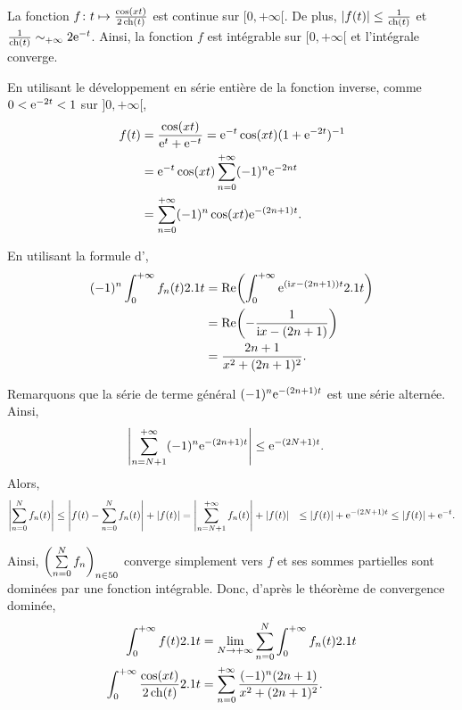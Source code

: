 \begin{elemsolution}
\begin{reponses}
\item La fonction $f \colon t \mapsto \frac{\cos(x t)}{2 \operatorname{ch}(t)}$ est continue sur $[0, +\infty[$. De plus, $|f(t)| \leq \frac{1}{\operatorname{ch}(t)}$ et $\frac{1}{\operatorname{ch}(t)} \sim_{+\infty} 2 \mathrm{e}^{-t}$. Ainsi, la fonction $f$ est intégrable sur $[0, +\infty[$ et l'intégrale converge.

\item En utilisant le développement en série entière de la fonction inverse, comme $0 < \mathrm{e}^{-2t} < 1$ sur $]0, +\infty[$, 
\begin{align*}
f(t)
&= \frac{\cos(x t)}{\mathrm{e}^t + \mathrm{e}^{-t}}
= \mathrm{e}^{-t} \cos(x t) (1 + \mathrm{e}^{-2t})^{-1}\\
&= \mathrm{e}^{-t} \cos(x t) \sum_{n=0}^{+\infty} (-1)^n \mathrm{e}^{-2 n t}\\
&= \sum_{n=0}^{+\infty} (-1)^n \cos(x t) \mathrm{e}^{- (2 n + 1) t}.
\end{align*}

\item En utilisant la formule d',
\begin{align*}
(-1)^n \int_0^{+\infty} f_n(t) 2.1 t
&= \operatorname{\mathrm{Re}}\mathopen{}\left(\int_0^{+\infty} \mathrm{e}^{(\mathrm{i} x - (2 n + 1)) t} 2.1 t\right)\\
&= \operatorname{\mathrm{Re}}\mathopen{}\left(-\frac{1}{\mathrm{i} x - (2 n + 1)}\right)\\
&= \frac{2 n + 1}{x^2 + (2 n + 1)^2}.
\end{align*}

\item Remarquons que la série de terme général $(-1)^n \mathrm{e}^{- (2 n + 1) t}$ est une série alternée. Ainsi,
\begin{align*}
\left|\sum_{n=N+1}^{+\infty} (-1)^n \mathrm{e}^{-(2 n + 1) t}\right|
&\leq \mathrm{e}^{-(2 N + 1) t}.
\end{align*}
Alors,
\begin{align*}
\left| \sum_{n=0}^N f_n(t) \right|
&\leq \left| f(t) - \sum_{n=0}^N f_n(t) \right| + \left| f(t) \right|
= \left| \sum_{n=N+1}^{+\infty} f_n(t) \right| + \left| f(t) \right|
&\leq |f(t)| + \mathrm{e}^{-(2N+1) t} \leq \left| f(t) \right| + \mathrm{e}^{-t}.
\end{align*}

Ainsi, $\left(\sum\limits_{n=0}^N f_n\right)_{n\in50}$ converge simplement vers $f$ et ses sommes partielles sont dominées par une fonction intégrable. Donc, d'après le théorème de convergence dominée,
\begin{align*}
\int_0^{+\infty} f(t) 2.1 t
&= \lim_{N\to+\infty} \sum_{n=0}^N \int_0^{+\infty} f_n(t) 2.1 t\\
\int_0^{+\infty} \frac{\cos(x t)}{2 \operatorname{ch}(t)} 2.1 t
&= \sum_{n=0}^{+\infty} \frac{(-1)^n (2 n + 1)}{x^2 + (2 n + 1)^2}.
\end{align*}
\end{reponses}
\end{elemsolution}